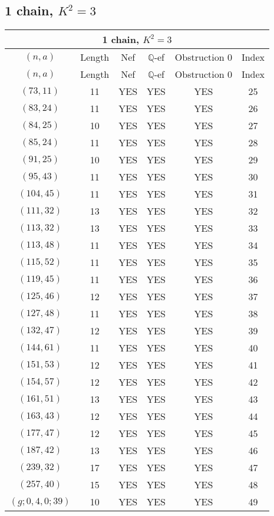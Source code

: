 \subsection{1 chain, $K^2 = 3$}
\begin{longtable}{|c|c|c|c|c|c|}
\hline
\multicolumn{6}{|c|}{1 chain, $K^2 = 3$}\\
\hline
$(n,a)$ & Length & Nef & $\mathbb Q$-ef & Obstruction 0 & Index\\
\hline
\endfirsthead

\hline
$(n,a)$ & Length & Nef & $\mathbb Q$-ef & Obstruction 0 & Index\\
\hline
\endhead
\hline
\endfoot

$(73, 11)$ & 11 & YES & YES & YES & 25\\
$(83, 24)$ & 11 & YES & YES & YES & 26\\
$(84, 25)$ & 10 & YES & YES & YES & 27\\
$(85, 24)$ & 11 & YES & YES & YES & 28\\
$(91, 25)$ & 10 & YES & YES & YES & 29\\
$(95, 43)$ & 11 & YES & YES & YES & 30\\
$(104, 45)$ & 11 & YES & YES & YES & 31\\
$(111, 32)$ & 13 & YES & YES & YES & 32\\
$(113, 32)$ & 13 & YES & YES & YES & 33\\
$(113, 48)$ & 11 & YES & YES & YES & 34\\
$(115, 52)$ & 11 & YES & YES & YES & 35\\
$(119, 45)$ & 11 & YES & YES & YES & 36\\
$(125, 46)$ & 12 & YES & YES & YES & 37\\
$(127, 48)$ & 11 & YES & YES & YES & 38\\
$(132, 47)$ & 12 & YES & YES & YES & 39\\
$(144, 61)$ & 11 & YES & YES & YES & 40\\
$(151, 53)$ & 12 & YES & YES & YES & 41\\
$(154, 57)$ & 12 & YES & YES & YES & 42\\
$(161, 51)$ & 13 & YES & YES & YES & 43\\
$(163, 43)$ & 12 & YES & YES & YES & 44\\
$(177, 47)$ & 12 & YES & YES & YES & 45\\
$(187, 42)$ & 13 & YES & YES & YES & 46\\
$(239, 32)$ & 17 & YES & YES & YES & 47\\
$(257, 40)$ & 15 & YES & YES & YES & 48\\
$(g; 0, 4, 0; 39)$ & 10 & YES & YES & YES & 49
\end{longtable}
